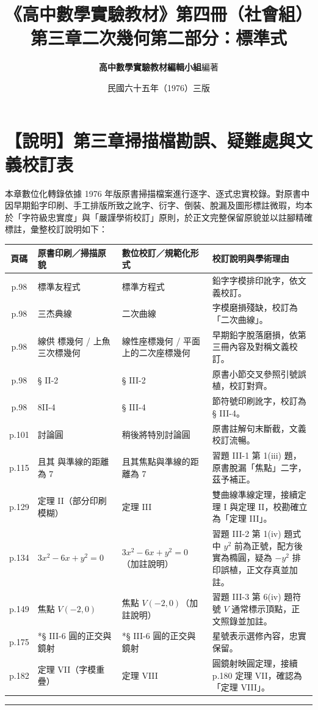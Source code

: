 \documentclass[a4paper,12pt,twoside]{article}
\title{\LARGE\textbf{《高中數學實驗教材》第四冊（社會組）}\\[0.5em] \Large\textbf{第三章\quad 二次幾何\quad 第二部分：標準式}}
\author{\textbf{高中數學實驗教材編輯小組}\quad 編著}
\date{民國六十五年（1976）三版}
\begin{document}
\maketitle
\thispagestyle{firstpage}

\section*{【說明】第三章掃描檔勘誤、疑難處與文義校訂表}

本章數位化轉錄依據 1976 年版原書掃描檔案進行逐字、逐式忠實校錄。對原書中因早期鉛字印刷、手工排版所致之訛字、衍字、倒裝、脫漏及圖形標註微瑕，均本於「字符級忠實度」與「嚴謹學術校訂」原則，於正文完整保留原貌並以註腳精確標註，彙整校訂說明如下：

\begin{table}[htbp]
\centering
\small
\begin{tabularx}{\textwidth}{|c|p{4.2cm}|p{4.5cm}|X|}
\hline
\textbf{頁碼} & \textbf{原書印刷／掃描原貌} & \textbf{數位校訂／規範化形式} & \textbf{校訂說明與學術理由} \\ \hline
p.98 & 標準友程式 & 標準方程式 & 鉛字字模排印訛字，依文義校訂。 \\ \hline
p.98 & 三杰典線 & 二次曲線 & 字模磨損殘缺，校訂為「二次曲線」。 \\ \hline
p.98 & 線供 標幾何 / 上魚三次標幾何 & 線性座標幾何 / 平面上的二次座標幾何 & 早期鉛字脫落磨損，依第三冊內容及對稱文義校訂。 \\ \hline
p.98 & § II-2 & § III-2 & 原書小節交叉參照引號誤植，校訂對齊。 \\ \hline
p.98 & 8II-4 & § III-4 & 節符號印刷訛字，校訂為 § III-4。 \\ \hline
p.101 & 討論圓 & 稍後將特別討論圓 & 原書註解句末斷截，文義校訂流暢。 \\ \hline
p.115 & 且其 與準線的距離為 7 & 且其焦點與準線的距離為 7 & 習題 III-1 第 1(iii) 題，原書脫漏「焦點」二字，茲予補正。 \\ \hline
p.129 & 定理 II（部分印刷模糊） & 定理 III & 雙曲線準線定理，接續定理 I 與定理 II，校勘確立為「定理 III」。 \\ \hline
p.134 & $3x^2 - 6x + y^2 = 0$ & $3x^2 - 6x + y^2 = 0$（加註說明） & 習題 III-2 第 1(iv) 題式中 $y^2$ 前為正號，配方後實為橢圓，疑為 $-y^2$ 排印誤植，正文存真並加註。 \\ \hline
p.149 & 焦點 $V(-2,0)$ & 焦點 $V(-2,0)$（加註說明） & 習題 III-3 第 6(iv) 題符號 $V$ 通常標示頂點，正文照錄並加註。 \\ \hline
p.175 & *§ III-6 圓的正交與鏡射 & *§ III-6 圓的正交與鏡射 & 星號表示選修內容，忠實保留。 \\ \hline
p.182 & 定理 VII（字模重疊） & 定理 VIII & 圓鏡射映圓定理，接續 p.180 定理 VII，確認為「定理 VIII」。 \\ \hline
\end{tabularx}
\end{table}

\vspace{1em}
\hrule
\vspace{1em}

\tableofcontents
\newpage


\end{document}
